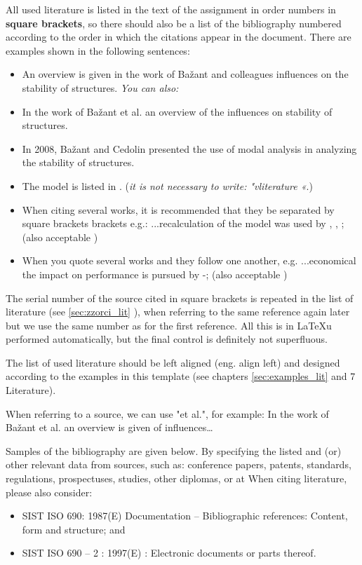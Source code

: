 All used literature is listed in the text of the assignment in order
numbers in \textbf{square brackets}, so there should also be a list of the bibliography
numbered according to the order in which the citations appear in the document. There are examples
shown in the following sentences:
\begin{itemize}
\item An overview is given in the work of Bažant and colleagues \cite{bazant_1991}
influences on the stability of structures. \emph{You can also:}
\item In the work of Bažant et al. \cite{bazant_1991} an overview of the influences on
stability of structures.
\item In 2008, Bažant and Cedolin \cite{Bazant_2008} presented
the use of modal analysis in analyzing the stability of structures.
\item The model is listed in \cite{Doe_1991}. (\emph{it is not necessary to write: "vliterature \cite{Doe_1991}«}.)
\item When citing several works, it is recommended that they be separated by square brackets
brackets e.g.: ...recalculation of the model was used by \cite{bazant_1991},
\cite{Doe_1991}, \cite{Bazant_2008}; (also acceptable
\cite{bazant_1991,Doe_1991,Bazant_2008})
\item When you quote several works and they follow one another, e.g. ...economical
the impact on performance is pursued by \cite{bazant_1991}-\cite{Bazant_2008};
(also acceptable \cite{bazant_1991, stropnik_1997,
Doe_1991,Loukides_2020, Bazant_2008})
\end{itemize}

The serial number of the source cited in square brackets is
repeated in the list of literature (see \ref{sec:zzorci_lit}
), when referring to the same reference again later
but we use the same number as for the first reference. All this is in \LaTeX u
performed automatically, but the final control is definitely not superfluous.

The list of used literature should be left aligned (eng. align left) and
designed according to the examples in this template (see chapters \ref{sec:examples_lit}
 and 7 Literature).

When referring to a source, we can use "et
al.", for example: In the work of Bažant et al. \cite{bazant_1991} an overview is given
of influences\ldots

Samples of the bibliography are given below. By specifying the listed and (or)
other relevant data from sources, such as: conference papers,
patents, standards, regulations, prospectuses, studies, other diplomas, or at
When citing literature, please also consider:
\begin{itemize}
\item SIST ISO 690: 1987(E) Documentation – Bibliographic references:
Content, form and structure; and
\item SIST ISO 690 – 2 : 1997(E) : Electronic documents or parts thereof.
\end{itemize}


